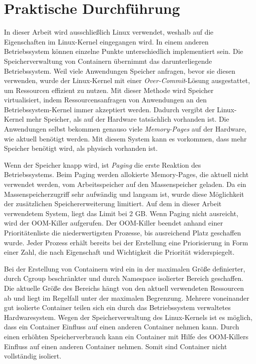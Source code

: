 \thispagestyle{empty}
\section{Praktische Durchführung}
\label{Isolation Container}

In dieser Arbeit wird ausschließlich Linux verwendet, weshalb auf die Eigenschaften im Linux-Kernel eingegangen wird. In einem anderen Betriebssystem können einzelne Punkte unterschiedlich implementiert sein. Die Speicherverwaltung von Containern übernimmt das darunterliegende Betriebssystem. Weil viele Anwendungen Speicher anfragen, bevor sie diesen verwenden, wurde der Linux-Kernel mit einer \emph{Over-Commit}-Lösung ausgestattet, um Ressourcen effizient zu nutzen. Mit dieser Methode wird Speicher virtualisiert, indem Ressourcensanfragen von Anwendungen an den Betriebssystem-Kernel immer akzeptiert werden. Dadurch vergibt der Linux-Kernel mehr Speicher, als auf der Hardware tatsächlich vorhanden ist. Die Anwendungen selbst bekommen genauso viele \emph{Memory-Pages} auf der Hardware, wie aktuell benötigt werden. Mit diesem System kann es vorkommen, dass mehr Speicher benötigt wird, als physisch vorhanden ist. 

Wenn der Speicher knapp wird, ist \emph{Paging} die erste Reaktion des Betriebssystems. Beim Paging werden allokierte Memory-Pages, die aktuell nicht verwendet werden, vom Arbeitsspeicher auf den Massenspeicher geladen. Da ein Massenspeicherzugriff sehr aufwändig und langsam ist, wurde diese Möglichkeit der zusätzlichen Speichererweiterung limitiert. Auf dem in dieser Arbeit verwendetem System, liegt das Limit bei 2 GB. Wenn Paging nicht ausreicht, wird der \ac{OOM-Killer} aufgerufen. Der OOM-Killer beendet anhand einer Prioritätenliste die niederwertigsten Prozesse, bis ausreichend Platz geschaffen wurde. Jeder Prozess erhält bereits bei der Erstellung eine Priorisierung in Form einer Zahl, die nach Eigenschaft und Wichtigkeit die Priorität widerspiegelt.

Bei der Erstellung von Containern wird ein in der maximalen Größe definierter, durch Cgroup beschränkter und durch Namespace isolierter Bereich geschaffen. Die aktuelle Größe des Bereichs hängt von den aktuell verwendeten Ressourcen ab und liegt im Regelfall unter der maximalen Begrenzung. Mehrere voneinander gut isolierte Container teilen sich ein durch das Betriebssystem verwaltetes Hardwaresystem. Wegen der Speicherverwaltung des Linux-Kernels ist es möglich, dass ein Container Einfluss auf einen anderen Container nehmen kann. Durch einen erhöhten Speicherverbrauch kann ein Container mit Hilfe des OOM-Killers Einfluss auf einen anderen Container nehmen. Somit sind Container nicht vollständig isoliert.

